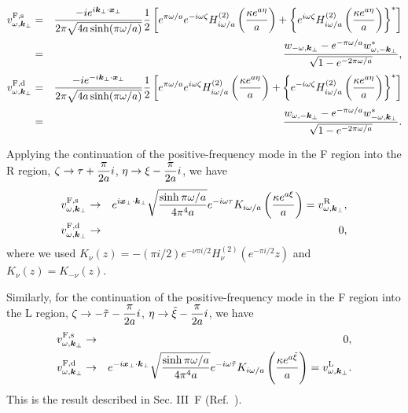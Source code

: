 \documentclass[aps,prd,preprintnumbers,nofootinbib,showpacs,11pt]{revtex4}%
\begin{document}
\begin{widetext}
\begin{eqnarray}
v^{\rm F,s}_{\omega,\bm k_\perp}&=& 
{-ie^{i\bm k_\perp\cdot \bm x_\perp}\over 2\pi\sqrt{4a\sinh (\pi \omega/a)}}
{1\over 2}
\left[e^{\pi \omega/a} e^{-i\omega\zeta} H_{i\omega/a}^{(2)}\left({\kappa e^{a\eta}\over a}\right)
+\left\{e^{i\omega\zeta} H_{i\omega/a}^{(2)}\left({\kappa e^{a\eta}\over a}\right)\right\}^*
\right]
\nonumber\\
&=&
{w_{-\omega,\bm k_\perp}-e^{-\pi\omega/a}w_{\omega,-\bm k_\perp}^*\over \sqrt{1-e^{-2\pi\omega/a}}},
\end{eqnarray}
\begin{eqnarray}
v^{\rm F,d}_{\omega,\bm k_\perp}&=& 
{-ie^{-i\bm k_\perp\cdot \bm x_\perp}\over 2\pi\sqrt{4a\sinh (\pi \omega/a)}}
{1\over 2}
\left[e^{\pi \omega/a} e^{i\omega\zeta} H_{i\omega/a}^{(2)}\left({\kappa e^{a\eta}\over a}\right)
+\left\{e^{-i\omega\zeta} H_{i\omega/a}^{(2)}\left({\kappa e^{a\eta}\over a}\right)\right\}^*
\right]
\nonumber\\
&=&
{w_{\omega,-\bm k_\perp}-e^{-\pi\omega/a}w_{-\omega,\bm k_\perp}^*\over \sqrt{1-e^{-2\pi\omega/a}}}.
\end{eqnarray}

Applying the continuation of the positive-frequency mode in the F region into the R region, 
$\displaystyle{\zeta\rightarrow\tau+{\pi \over 2a }i}$, 
 $\displaystyle{\eta\rightarrow\xi-{\pi \over 2a}i}$,
we have
\begin{eqnarray}
v^{\rm F,s}_{\omega,\bm k_\perp}&\rightarrow&{e^{i\bm x_\perp\cdot\bm k_\perp}}\sqrt{\sinh\pi\omega/a\over 4\pi^4a}e^{-i\omega\tau}K_{i\omega/a} 
\left({\kappa e^{a\xi}\over a}\right)=v^{\rm R}_{\omega,\bm k_\perp},
\\
v^{\rm F,d}_{\omega,\bm k_\perp}&\rightarrow&0 ,
\end{eqnarray}
where we used $K_\nu(z)=-(\pi i/2)e^{-\nu\pi i/2}H_\nu^{(2)}(e^{-\pi i/2}z)$ and $K_\nu(z)=K_{-\nu}(z)$.

Similarly, for the continuation of the positive-frequency mode in the F region into the L region, 
 $\displaystyle{ \zeta\rightarrow -\tilde\tau-{\pi \over 2a }i}$,
 $\displaystyle{ \eta\rightarrow\tilde\xi-{\pi \over 2a}i}$,
we have
\begin{eqnarray}
v^{\rm F,s}_{\omega,\bm k_\perp}&\rightarrow&0,
\\
v^{\rm F,d}_{\omega,\bm k_\perp}&\rightarrow&{e^{-i\bm x_\perp\cdot\bm k_\perp}}\sqrt{\sinh\pi\omega/a\over 4\pi^4a}e^{-i\omega\tilde\tau}K_{i\omega/a} 
\left({\kappa e^{a\tilde\xi}\over a}\right)=v^{\rm L}_{\omega,\bm k_\perp} .
\end{eqnarray}
This is the result described in Sec. III~F (Ref.~\cite{Higuchi}).


\end{widetext}
\end{document}
